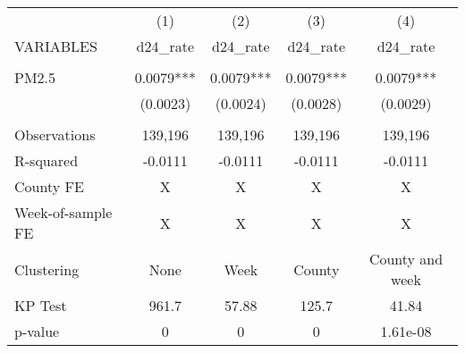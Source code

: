 \begin{tabular}{lcccc} \hline
 & (1) & (2) & (3) & (4) \\
VARIABLES & d24\_rate & d24\_rate & d24\_rate & d24\_rate \\ \hline
 &  &  &  &  \\
PM2.5 & 0.0079*** & 0.0079*** & 0.0079*** & 0.0079*** \\
 & (0.0023) & (0.0024) & (0.0028) & (0.0029) \\
 &  &  &  &  \\
Observations & 139,196 & 139,196 & 139,196 & 139,196 \\
R-squared & -0.0111 & -0.0111 & -0.0111 & -0.0111 \\
County FE & X & X & X & X \\
Week-of-sample FE & X & X & X & X \\
Clustering & None & Week & County & County and week \\
KP Test & 961.7 & 57.88 & 125.7 & 41.84 \\
 p-value & 0 & 0 & 0 & 1.61e-08 \\ \hline
\end{tabular}
